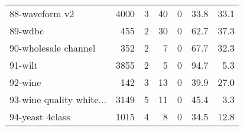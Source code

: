 \begin{table}[h]
\begin{center}
\begin{tabular}{l|r r r r r r}
88-waveform v2 & 4000 & 3 & 40 & 0 &  33.8 &  33.1\\
89-wdbc & 455 & 2 & 30 & 0 &  62.7 &  37.3\\
90-wholesale channel & 352 & 2 & 7 & 0 &  67.7 &  32.3\\\hline
91-wilt & 3855 & 2 & 5 & 0 &  94.7 &   5.3\\
92-wine & 142 & 3 & 13 & 0 &  39.9 &  27.0\\
93-wine quality white... & 3149 & 5 & 11 & 0 &  45.4 &   3.3\\\hline
94-yeast 4class & 1015 & 4 & 8 & 0 &  34.5 &  12.8\\\end{tabular}
\label{tab:datasetsc}
\end{center}
\end{table}